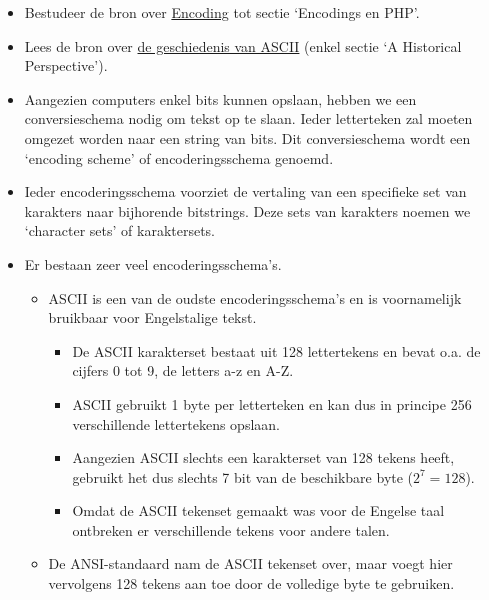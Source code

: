 \documentclass[]{tufte-book}
\providecommand{\tightlist}{%
  \setlength{\itemsep}{0pt}\setlength{\parskip}{0pt}}
\begin{document}
\begin{itemize}
\tightlist
\item
  Bestudeer de bron over \href{http://kunststube.net/encoding/}{Encoding} tot sectie `Encodings en PHP'.
\item
  Lees de bron over \href{https://www.joelonsoftware.com/2003/10/08/the-absolute-minimum-every-software-developer-absolutely-positively-must-know-about-unicode-and-character-sets-no-excuses/}{de geschiedenis van ASCII} (enkel sectie `A Historical Perspective').
\item
  Aangezien computers enkel bits kunnen opslaan, hebben we een conversieschema nodig om tekst op te slaan. Ieder letterteken zal moeten omgezet worden naar een string van bits. Dit conversieschema wordt een `encoding scheme' of encoderingsschema genoemd.
\item
  Ieder encoderingsschema voorziet de vertaling van een specifieke set van karakters naar bijhorende bitstrings. Deze sets van karakters noemen we `character sets' of karaktersets.
\item
  Er bestaan zeer veel encoderingsschema's.

  \begin{itemize}
  \tightlist
  \item
    ASCII is een van de oudste encoderingsschema's en is voornamelijk bruikbaar voor Engelstalige tekst.

    \begin{itemize}
    \tightlist
    \item
      De ASCII karakterset bestaat uit 128 lettertekens en bevat o.a. de cijfers 0 tot 9, de letters a-z en A-Z.
    \item
      ASCII gebruikt 1 byte per letterteken en kan dus in principe 256 verschillende lettertekens opslaan.
    \item
      Aangezien ASCII slechts een karakterset van 128 tekens heeft, gebruikt het dus slechts 7 bit van de beschikbare byte (\(2^7 = 128\)).
    \item
      Omdat de ASCII tekenset gemaakt was voor de Engelse taal ontbreken er verschillende tekens voor andere talen.
    \end{itemize}
  \item
    De ANSI-standaard nam de ASCII tekenset over, maar voegt hier vervolgens 128 tekens aan toe door de volledige byte te gebruiken.


\end{itemize}
\end{itemize}
\end{document}
